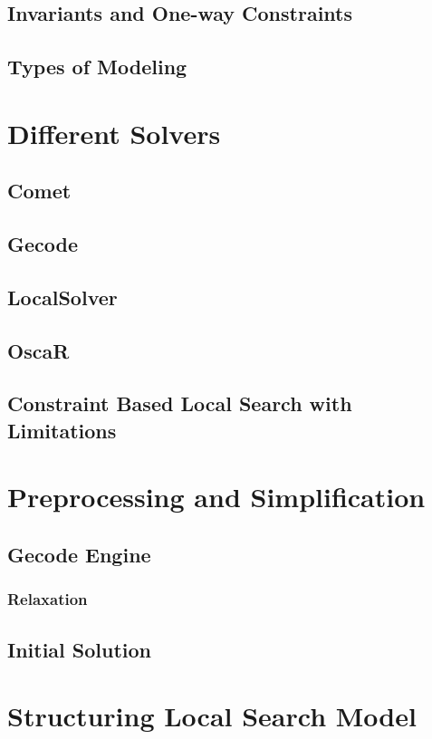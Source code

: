 \documentclass[a4paper,12pt]{article}
\begin{document}
    \subsection{Invariants and One-way Constraints}
  \subsection{Types of Modeling }
  

\section{Different Solvers }
  \subsection{Comet}

  \subsection{Gecode}
  \subsection{LocalSolver}
  \subsection{OscaR}
  \subsection{ Constraint Based Local Search with Limitations} %
\section{Preprocessing and Simplification}
  \subsection{Gecode Engine}
    \subsubsection{Relaxation}
  \subsection{Initial Solution}
\section{Structuring Local Search Model}

\end{document}
